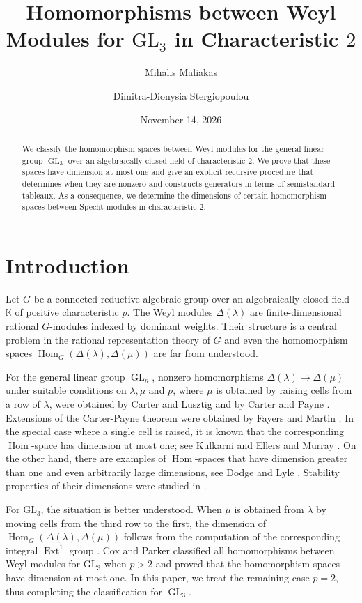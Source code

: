 \documentclass[11pt]{amsart}
\title[Homomorphism spaces for $\mathrm{GL}_3$ in characteristic $2$]{Homomorphisms between Weyl Modules for $\mathrm{GL}_3$ in Characteristic $2$}
\author[M. Maliakas]{Mihalis Maliakas}
\author[D.-D. Stergiopoulou]{Dimitra-Dionysia Stergiopoulou}
\date{November 14, 2026}
\theoremstyle{remark}
\theoremstyle{definition}
\newcommand{\Hom}{\operatorname{Hom}}
\newcommand{\GL}{\operatorname{GL}}
\newcommand{\la}{\lambda}
\newcommand{\K}{\mathbb K}
\numberwithin{equation}{section}
\begin{document}
	\begin{abstract}
We classify the homomorphism spaces between Weyl modules for the general linear group $\GL_3$ over an algebraically closed field of characteristic $2$. We prove that these spaces have dimension at most one and give an explicit recursive procedure that determines when they are nonzero and constructs generators in terms of semistandard tableaux. As a consequence, we determine the dimensions of certain homomorphism spaces between Specht modules in characteristic $2$.
	\end{abstract}
	\maketitle


	\section{Introduction}\label{sec1}
	Let $G$ be a connected reductive algebraic group over an algebraically closed
	field $\K$ of positive characteristic $p$. The Weyl modules
	$\Delta(\la)$ are finite-dimensional rational $G$-modules indexed
	by dominant weights. Their structure is a central problem in the rational representation
	theory of $G$ and even the homomorphism spaces
	$\Hom_G(\Delta(\la),\Delta(\mu))$ are far from understood.

	For the general linear group $\GL_n$, nonzero homomorphisms $\Delta(\la) \to \Delta(\mu)$
	under suitable conditions on $\la, \mu$ and  $p$, where $\mu$ is obtained by raising cells from a row of $\la$, were obtained by Carter and Lusztig \cite{CL} and by Carter and Payne \cite{CPay}. Extensions of the Carter-Payne theorem were obtained by Fayers and Martin \cite{FM}. In the special case where a single cell is raised, it is known that the corresponding $\Hom$-space has dimension at most one; see Kulkarni \cite{Ku} and Ellers and Murray \cite{EM}. On the other hand, there are examples of $\Hom$-spaces that have dimension greater than one and even arbitrarily large dimensions, see Dodge \cite{Dodge} and Lyle \cite{Lyle}. Stability properties of their dimensions were studied in \cite{EMS}.

For $\mathrm{GL}_3$, the situation is better understood. When $\mu$ is obtained from $\la$ by moving cells from the third row to the first, the dimension of $\Hom_G(\Delta(\la),\Delta(\mu))$ follows from the computation of the corresponding integral $\operatorname{Ext}^1$ group \cite{FC,BF}. Cox and Parker \cite{CP} classified all homomorphisms
between Weyl modules for $\mathrm{GL}_3$ when $p>2$ and proved
that the  homomorphism spaces have dimension at most one. In this paper, we treat the remaining case $p=2$, thus completing the classification for $\GL_3$.
\end{document}
